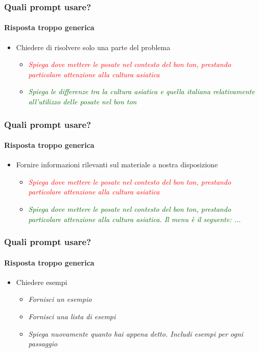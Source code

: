 \begin{exampleframe}
    \frametitle{Quali prompt usare?}
    \framesubtitle{Risposta troppo generica}

    \begin{itemize}
        \item Chiedere di risolvere solo una parte del problema
        \begin{itemize}
            \item \textcolor{red}{\textit{Spiega dove mettere le posate nel contesto del bon ton, prestando particolare attenzione alla cultura asiatica}}
            \item \textcolor{DarkGreen}{\textit{Spiega le differenze tra la cultura asiatica e quella italiana relativamente all'utilizzo delle posate nel bon ton}}
        \end{itemize}
    \end{itemize}
\end{exampleframe}

\begin{exampleframe}
    \frametitle{Quali prompt usare?}
    \framesubtitle{Risposta troppo generica}

    \begin{itemize}
        \item Fornire informazioni rilevanti sul materiale a nostra disposizione
        \begin{itemize}
            \item \textcolor{red}{\textit{Spiega dove mettere le posate nel contesto del bon ton, prestando particolare attenzione alla cultura asiatica}}
            \item \textcolor{DarkGreen}{\textit{Spiega dove mettere le posate nel contesto del bon ton, prestando particolare attenzione alla cultura asiatica. Il menu è il seguente: ...}}
        \end{itemize}
    \end{itemize}
\end{exampleframe}

\begin{exampleframe}
    \frametitle{Quali prompt usare?}
    \framesubtitle{Risposta troppo generica}

    \begin{itemize}
        \item Chiedere esempi
        \begin{itemize}
            \item \textit{Fornisci un esempio}
            \item \textit{Fornisci una lista di esempi}
            \item \textit{Spiega nuovamente quanto hai appena detto. Includi esempi per ogni passaggio}
        \end{itemize}
    \end{itemize}
\end{exampleframe}

